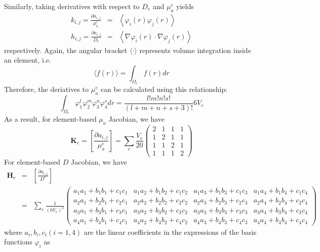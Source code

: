 \documentclass{article}
\begin{document}
Similarly, taking derivatives with respect to $D_e$ and $\mu_a^{e}$ yields
\begin{eqnarray}
k_{i,j}=\frac{\partial
a_{i,j}}{\mu_a^{e}}&=&\left\langle\varphi_i(r)\varphi_j(r)\right\rangle\\
h_{i,j}=\frac{\partial a_{i,j}}{D_e}&=&\left\langle
\nabla\varphi_i(r)\cdot\nabla\varphi_j(r)\right\rangle
\end{eqnarray}
respectively. Again, the angular bracket $\langle\cdot\rangle$ represents volume integration inside
an element, i.e.
\begin{equation}
\langle f(r) \rangle=\int_{\Omega_e}f(r)dr
\end{equation}
Therefore, the deriatives to $\mu_a^e$ can be calculated using this relationship:
\begin{equation}
\int_{\Omega_e}\varphi_1^l\varphi_2^m\varphi_3^n\varphi_4^sdr=\frac{l!m!n!s!}{(l+m+n+s+3)!}6V_e
\end{equation}
As a result, for element-based $\mu_a$ Jacobian, we have
\begin{equation}
\mathbf{K}_e=\left[\frac{\partial a_{i,j}}{\mu_a^{e}}\right]=\sum_e\frac{V_e}{20}\left(
\begin{array}{llll}
2 & 1 & 1 & 1 \\
1 & 2 & 1 & 1 \\
1 & 1 & 2 & 1 \\
1 & 1 & 1 & 2 
\end{array}
\right)
\end{equation}
For element-based $D$ Jacobian, we have
\begin{eqnarray}\nonumber
\mathbf{H}_e&=&\left[\frac{\partial
a_{i,j}}{D^{e}}\right]\\&=&\sum_e\frac{1}{(6V_e)^2}\left(
\begin{array}{llll}
a_1a_1+b_1b_1+c_1c_1 & a_1a_2+b_1b_2+c_1c_2 & a_1a_3+b_1b_3+c_1c_3 & a_1a_4+b_1b_4+c_1c_4 \\
a_2a_1+b_2b_1+c_2c_1 & a_2a_2+b_2b_2+c_2c_2 & a_2a_3+b_2b_3+c_2c_3 & a_2a_4+b_2b_4+c_2c_4 \\
a_3a_1+b_3b_1+c_3c_1 & a_3a_2+b_3b_2+c_3c_2 & a_3a_3+b_3b_3+c_3c_3 & a_3a_4+b_3b_4+c_3c_4 \\
a_4a_1+b_4b_1+c_4c_1 & a_4a_2+b_4b_2+c_4c_2 & a_4a_3+b_4b_3+c_4c_3 & a_4a_4+b_4b_4+c_4c_4
\end{array}
\right)
\end{eqnarray}
where $a_i,b_i,c_i (i=1,4)$ are the linear coefficients in the expressions of the basis functions $\varphi_i$ as
\end{document}
